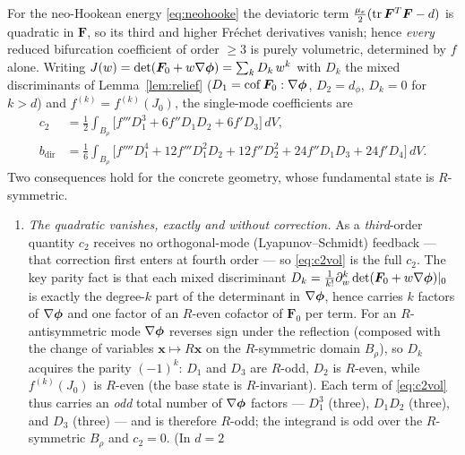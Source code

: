 \begin{lemma}
    \label{lem:volcoeff}
    For the neo-Hookean energy \eqref{eq:neohooke} the deviatoric term $\tfrac{\mu_e}{2}(\operatorname{tr}\bm F^T\bm F-d)$ is quadratic
    in $\bm F$, so its third and higher Fr\'echet derivatives vanish; hence \emph{every} reduced bifurcation coefficient
    of order $\ge3$ is purely volumetric, determined by $f$ alone. Writing
    $J(w)=\det(\bm F_0+w\nabla\bm\phi)=\sum_k D_k\,w^k$ with $D_k$ the mixed discriminants of Lemma~\ref{lem:relief}
    ($D_1=\operatorname{cof}\bm F_0:\nabla\bm\phi$, $D_2=d_\phi$, $D_{k}=0$ for $k>d$) and $f^{(k)}=f^{(k)}(J_0)$, the
    single-mode coefficients are
    \begin{align}
        \label{eq:c2vol}
        c_2              & = \tfrac12\!\int_{B_\rho}\!\big[f''' D_1^3+6 f'' D_1 D_2+6 f' D_3\big]\,dV, \\
        \label{eq:bvol}
        b_{\mathrm{dir}} & = \tfrac16\!\int_{B_\rho}\!\big[f'''' D_1^4+12 f''' D_1^2 D_2+12 f'' D_2^2
            +24 f'' D_1 D_3+24 f' D_4\big]\,dV.
    \end{align}
    Two consequences hold for the concrete geometry, whose fundamental state is $R$-symmetric.
    \begin{enumerate}
        \item[\textup{(i)}] \emph{The quadratic vanishes, exactly and without correction.} As a \emph{third}-order
              quantity $c_2$ receives no orthogonal-mode (Lyapunov--Schmidt) feedback --- that correction first enters
              at fourth order --- so \eqref{eq:c2vol} is the full $c_2$. The key parity fact is that each mixed
              discriminant $D_k=\tfrac1{k!}\partial_w^k\det(\bm F_0+w\nabla\bm\phi)|_0$ is exactly the degree-$k$ part of
              the determinant in $\nabla\bm\phi$, hence carries $k$ factors of $\nabla\bm\phi$ and one factor of an
              $R$-even cofactor of $\bm F_0$ per term. For an $R$-antisymmetric mode $\nabla\bm\phi$ reverses sign under
              the reflection (composed with the change of variables $\bm x\mapsto R\bm x$ on the $R$-symmetric domain
              $B_\rho$), so $D_k$ acquires the parity $(-1)^k$: $D_1$ and $D_3$ are $R$-odd, $D_2$ is $R$-even, while
              $f^{(k)}(J_0)$ is $R$-even (the base state is $R$-invariant). Each term of \eqref{eq:c2vol} thus carries an
              \emph{odd} total number of $\nabla\bm\phi$ factors --- $D_1^3$ (three), $D_1D_2$ (three), and $D_3$ (three)
              --- and is therefore $R$-odd; the integrand is odd over the $R$-symmetric $B_\rho$ and $c_2=0$. (In $d=2$

\end{enumerate}
\end{lemma}
